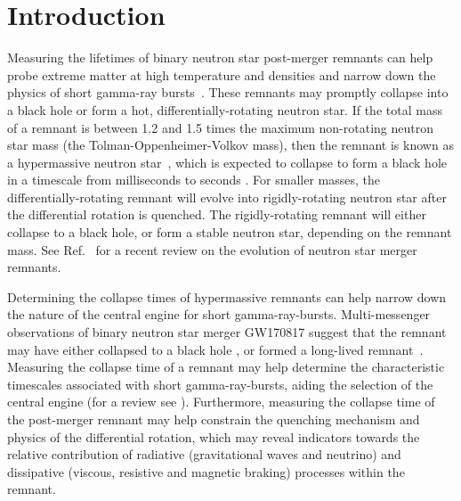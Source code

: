 \documentclass[../Thesis.tex]{subfiles}
\begin{document}
    \section{Introduction}
    \label{sec:introduction3}

    
    Measuring the lifetimes of binary neutron star post-merger remnants can help probe extreme matter at high temperature and densities and narrow down the physics of short gamma-ray bursts~\cite[e.g.,][]{Zhang2019,Ciolfi2020a}.
    These remnants may promptly collapse into a black hole or form a hot, differentially-rotating neutron star.
    If the total mass of a remnant is between 1.2 and 1.5 times the maximum non-rotating neutron star mass (the Tolman-Oppenheimer-Volkov mass), then the remnant is known as a hypermassive neutron star~\cite{Tolman1939,Oppenheimer1939,Breu2016,Weih2018,Baumgarte2000}, which is expected to collapse to form a black hole in a timescale from milliseconds to seconds \cite{Paschalidis2012}. 
    For smaller masses, the differentially-rotating remnant will evolve into rigidly-rotating neutron star after the differential rotation is quenched.
    The rigidly-rotating remnant will either collapse to a black hole, or form a stable neutron star, depending on the remnant mass.
    See Ref.~\cite{Sarin2021} for a recent review on the evolution of neutron star merger remnants.

    Determining the collapse times of hypermassive remnants can help narrow down the nature of the central engine for short gamma-ray-bursts. 
    Multi-messenger observations of binary neutron star merger GW170817 suggest that the remnant may have either collapsed to a black hole \cite[e.g.,][]{Metzger2018,Gill2019,Murguia-Berthier2021}, or formed a long-lived remnant~\cite[e.g.,][]{Yu2018}.
    Measuring the collapse time of a remnant may help determine the characteristic timescales associated with short gamma-ray-bursts, aiding the selection of the central engine (for a review see \cite{Zhang2019}).
    Furthermore, measuring the collapse time of the post-merger remnant may help constrain the quenching mechanism and physics of the differential rotation, which may reveal indicators towards the relative contribution of radiative (gravitational waves and neutrino) and dissipative (viscous, resistive and magnetic braking) processes within the remnant.\par
\end{document}
